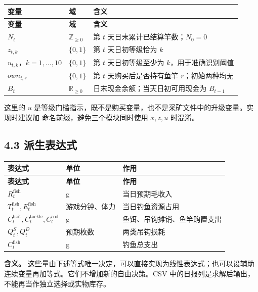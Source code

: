 \documentclass[11pt,a4paper]{article}
\begin{document}
{\small\begin{longtable}{L{0.23\dimexpr\textwidth-30pt\relax}L{0.21\dimexpr\textwidth-30pt\relax}L{0.56\dimexpr\textwidth-30pt\relax}}\toprule
\textbf{变量} & \textbf{域} & \textbf{含义}\\\midrule\endfirsthead
\textbf{变量} & \textbf{域} & \textbf{含义}\\\midrule\endhead
\bottomrule\endfoot
$N_t$ & $\mathbb Z_{\ge0}$ & 第 $t$ 天日末累计已结算竿数；$N_0=0$\\
$z_{t,k}$ & $\{0,1\}$ & 第 $t$ 天日初等级恰为 $k$\\
$u_{t,k}$，$k=1,\ldots,10$ & $\{0,1\}$ & 第 $t$ 天日初等级至少为 $k$，用于准确识别阈值\\
$own_{t,r}$ & $\{0,1\}$ & 第 $t$ 天购买后是否持有鱼竿 $r$；初始两种均无\\
$B_t$ & $\mathbb R_{\ge0}$ & 日末现金余额；当天日初可用现金为 $B_{t-1}$\\
\end{longtable}}

这里的 $u$ 是等级门槛指示，既不是购买变量，也不是采矿文件中的升级变量。实现时建议加  命名前缀，避免三个模块同时使用 $x,z,u$ 时混淆。\par

\subsection*{4.3 派生表达式}

{\small\begin{longtable}{L{0.22\dimexpr\textwidth-30pt\relax}L{0.24\dimexpr\textwidth-30pt\relax}L{0.54\dimexpr\textwidth-30pt\relax}}\toprule
\textbf{表达式} & \textbf{单位} & \textbf{作用}\\\midrule\endfirsthead
\textbf{表达式} & \textbf{单位} & \textbf{作用}\\\midrule\endhead
\bottomrule\endfoot
$R_t^{\mathrm{fish}}$ & g & 当日预期毛收入\\
$T_t^{\mathrm{fish}},E_t^{\mathrm{fish}}$ & 游戏分钟、体力 & 当日钓鱼资源占用\\
$C_t^{\mathrm{bait}},C_t^{\mathrm{tackle}},C_t^{\mathrm{rod}}$ & g & 鱼饵、吊钩摊销、鱼竿购置支出\\
$Q_t^S,Q_t^D$ & 预期枚数 & 两类吊钩损耗\\
$C_t^{\mathrm{fish}}$ & g & 钓鱼总支出\\
\end{longtable}}

\textbf{含义。} 这些量由下述等式唯一决定，可以直接实现为线性表达式；也可以设辅助连续变量再加等式。它们不增加新的自由决策。CSV 中的日报列是求解后输出，不能再当作独立选择或实物库存。\par
\end{document}
